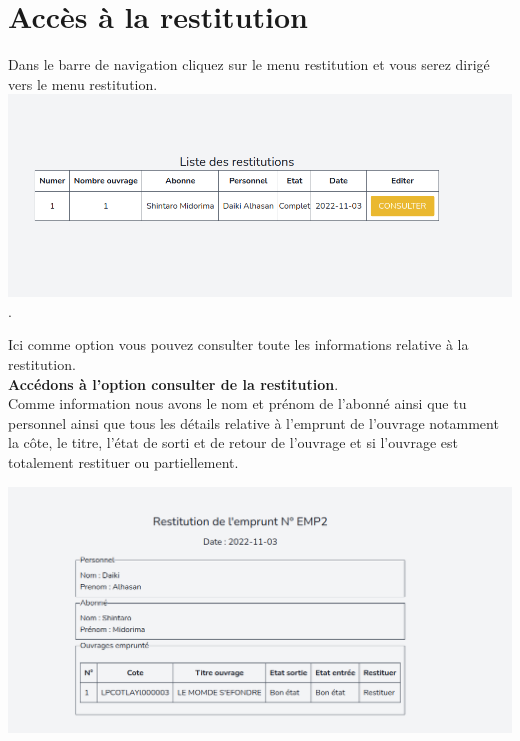 \documentclass[12pt,a4paper]{article}
\begin{document}
\section{Accès à la restitution}
Dans le barre de navigation cliquez sur le menu restitution et vous serez dirigé vers le menu restitution.\\

\includegraphics[scale=0.5]{images/ListeDesRestitutions.png}.

Ici comme option vous pouvez consulter toute les informations relative à la restitution.\\
\textbf{Accédons à l'option consulter de la restitution}.\\

Comme information nous avons le nom et prénom de l'abonné ainsi que tu personnel ainsi que tous les détails relative à l'emprunt de l'ouvrage notamment la côte, le titre, l'état de sorti et de retour de l'ouvrage et si l'ouvrage est totalement restituer ou partiellement.

\includegraphics[scale=0.5]{images/showRestitution.png}













\newpage
\end{document}
